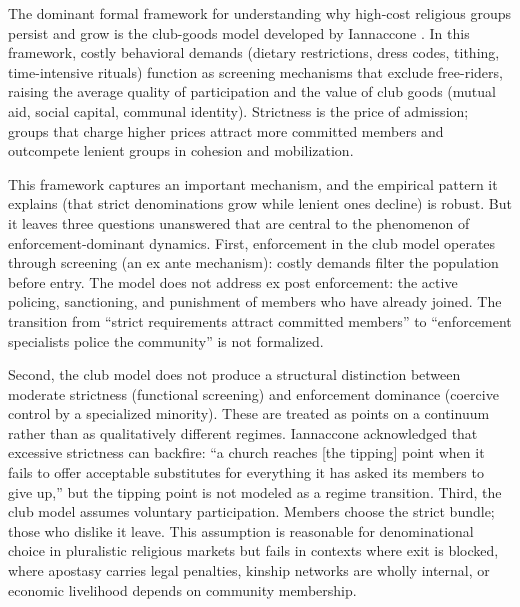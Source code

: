 \documentclass[12pt]{article}
\begin{document}
The dominant formal framework for understanding why high-cost religious groups persist and grow is the club-goods model developed by Iannaccone \cite{iannaccone1992,iannaccone1994}. In this framework, costly behavioral demands (dietary restrictions, dress codes, tithing, time-intensive rituals) function as screening mechanisms that exclude free-riders, raising the average quality of participation and the value of club goods (mutual aid, social capital, communal identity). Strictness is the price of admission; groups that charge higher prices attract more committed members and outcompete lenient groups in cohesion and mobilization.

This framework captures an important mechanism, and the empirical pattern it explains (that strict denominations grow while lenient ones decline) is robust. But it leaves three questions unanswered that are central to the phenomenon of enforcement-dominant dynamics. First, enforcement in the club model operates through screening (an ex ante mechanism): costly demands filter the population before entry. The model does not address ex post enforcement: the active policing, sanctioning, and punishment of members who have already joined. The transition from ``strict requirements attract committed members'' to ``enforcement specialists police the community'' is not formalized.

Second, the club model does not produce a structural distinction between moderate strictness (functional screening) and enforcement dominance (coercive control by a specialized minority). These are treated as points on a continuum rather than as qualitatively different regimes. Iannaccone \cite{iannaccone1994} acknowledged that excessive strictness can backfire: ``a church reaches [the tipping] point when it fails to offer acceptable substitutes for everything it has asked its members to give up,'' but the tipping point is not modeled as a regime transition. Third, the club model assumes voluntary participation. Members choose the strict bundle; those who dislike it leave. This assumption is reasonable for denominational choice in pluralistic religious markets but fails in contexts where exit is blocked, where apostasy carries legal penalties, kinship networks are wholly internal, or economic livelihood depends on community membership.
\end{document}
